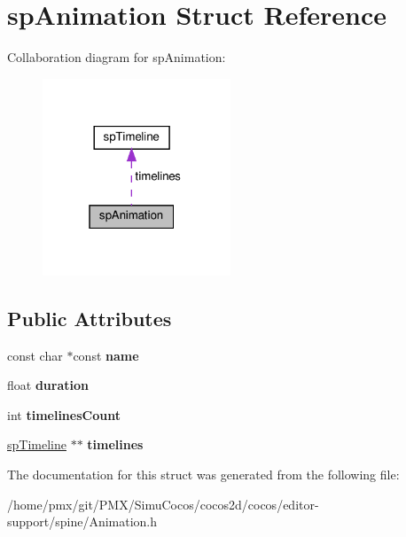 \hypertarget{structspAnimation}{}\section{sp\+Animation Struct Reference}
\label{structspAnimation}


Collaboration diagram for sp\+Animation\+:
\nopagebreak
\begin{figure}[H]
\begin{center}
\leavevmode
\includegraphics[width=159pt]{structspAnimation__coll__graph}
\end{center}
\end{figure}
\subsection*{Public Attributes}
\begin{DoxyCompactItemize}
\item 
\mbox{\label{structspAnimation_a7705039986daf44e7ac7ca17b941e3f6}} 
const char $\ast$const {\bfseries name}
\item 
\mbox{\label{structspAnimation_aa194b043b46d7f867887f817850efed1}} 
float {\bfseries duration}
\item 
\mbox{\label{structspAnimation_ab04f7a5a6693de0f6742921f13cb39b2}} 
int {\bfseries timelines\+Count}
\item 
\mbox{\label{structspAnimation_acb3e9dd1de67b08c8145527371a33109}} 
\hyperlink{structspTimeline}{sp\+Timeline} $\ast$$\ast$ {\bfseries timelines}
\end{DoxyCompactItemize}


The documentation for this struct was generated from the following file\+:\begin{DoxyCompactItemize}
\item 
/home/pmx/git/\+P\+M\+X/\+Simu\+Cocos/cocos2d/cocos/editor-\/support/spine/Animation.\+h\end{DoxyCompactItemize}
